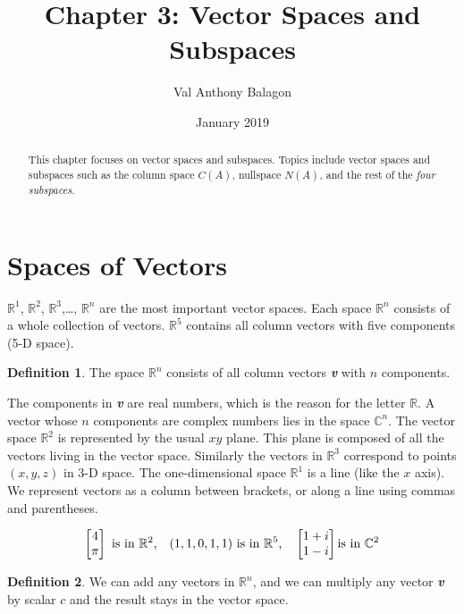 \documentclass[12pt, letterpaper]{article}
\author{Val Anthony Balagon}
\date{January 2019}
\title{Chapter 3: Vector Spaces and Subspaces}
\newcommand{\R}[1]{$\mathbb{R}^{#1}$}
\newcommand{\V}[1]{\textbf{\textit{#1}}}
\newcommand{\DefinitionSpace}{\vspace{15px}}
\theoremstyle{definition}
\newtheorem{definition}{Definition}[section]
\begin{document}
	\maketitle
	\begin{abstract}
		This chapter focuses on vector spaces and subspaces. Topics include vector spaces and subspaces such as the column space $C(A)$, nullspace $N(A)$, and the rest of the \emph{four subspaces}.
	\end{abstract}

\section{Spaces of Vectors}
	\R{1}, \R{2}, \R{3},\ldots, \R{n} are the most important vector spaces. Each space \R{n} consists of a whole collection of vectors. \R{5} contains all column vectors with five components (5-D space).
	
		\DefinitionSpace
			\begin{definition}
				The space \R{n} consists of all column vectors \V{v} with $n$ components.
			\end{definition} 	
		\DefinitionSpace
		
		The components in \V{v} are real numbers, which is the reason for the letter $\mathbb{R}$. A vector whose $n$ components are complex numbers lies in the space $\mathbb{C}^n$. The vector space \R{2} is represented by the usual $xy$ plane. This plane is composed of all the vectors living in the vector space. Similarly the vectors in \R{3} correspond to points $(x,y,z)$ in 3-D space. The one-dimensional space \R{1} is a line (like the $x$ axis). We represent vectors as a column between brackets, or along a line using commas and parentheses. 
			
				\begin{gather}
					\begin{bmatrix} 4 \\ \pi\end{bmatrix} \text{ is in \R{2},\quad} (1,1,0,1,1) \text{ is in \R{5},\quad} \begin{bmatrix} 1+i \\ 1-i\end{bmatrix} \text{is in $\mathbb{C}^2$} 
				\end{gather}
			
			\DefinitionSpace
				\begin{definition}
					We can add any vectors in \R{n}, and we can multiply any vector \V{v} by scalar $c$ and the result stays in the vector space.
				\end{definition} 	
			\DefinitionSpace
			
\end{document}
